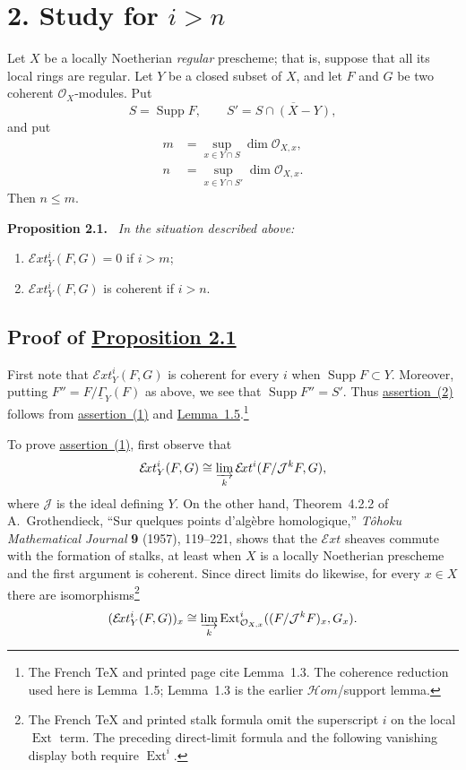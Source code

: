 \documentclass[11pt,a4paper,oneside]{book}
\providecommand{\sisi}[2]{#2}
\providecommand{\Jj}{\mathcal J}
\providecommand{\Oo}{\mathcal O}
\providecommand{\SheafGamma}{\underline{\Gamma}}
\providecommand{\SheafExt}{\mathcal E\!xt}
\providecommand{\OX}{\mathcal O_X}
\providecommand{\Supp}{\operatorname{Supp}}
\providecommand{\Extop}{\operatorname{Ext}}
\newenvironment{sgastatement}[1]
  {\par\addvspace{0.8\baselineskip}\noindent\textbf{#1.}\ \itshape}
  {\par\addvspace{0.35\baselineskip}}
\theoremstyle{plain}
\theoremstyle{definition}
\theoremstyle{remark}
\begin{document}
\section*{2. Study for $i>n$}

Let $X$ be a locally Noetherian \emph{regular} prescheme; that is, suppose that
all its local rings are regular. Let $Y$ be a closed subset of $X$, and let
$F$ and $G$ be two coherent $\OX$-modules. Put
\[
  S=\Supp F,\qquad S'=\overline{S\cap(X-Y)},
\]
and put
\begin{align*}
  m&=\sup_{x\in Y\cap S}\dim\Oo_{X,x},\\
  n&=\sup_{x\in Y\cap S'}\dim\Oo_{X,x}.
\end{align*}
Then $n\leq m$.

\begin{sgastatement}{Proposition 2.1}
In the situation described above:
\begin{enumerate}
\item $\SheafExt_Y^i(F,G)=0$ if $i>m$;
\item $\SheafExt_Y^i(F,G)$ is coherent if $i>n$.
\end{enumerate}
\end{sgastatement}

\subsection*{Proof of \hyperref[VII.2.1]{Proposition 2.1}}

First note that $\SheafExt_Y^i(F,G)$ is coherent for every $i$ when
$\Supp F\subset Y$. Moreover, putting $F''=F/\sisi{\Gamma}{\SheafGamma}_Y(F)$ as above, we see
that $\Supp F''=S'$. Thus \hyperref[VII.2.1]{assertion~(2)} follows from \hyperref[VII.2.1]{assertion~(1)} and
\hyperref[VII.1.5]{Lemma~1.5}.\footnote{The French TeX and printed page cite Lemma~1.3. The
coherence reduction used here is Lemma~1.5; Lemma~1.3 is the earlier
$\mathcal Hom$/support lemma.}

To prove \hyperref[VII.2.1]{assertion~(1)}, first observe that
\[
  \SheafExt_Y^i(F,G)\cong
  \varinjlim_k \SheafExt^i(F/\Jj^kF,G),
\]
where $\Jj$ is the ideal defining $Y$. On the other hand, Theorem~4.2.2 of
A.~Grothendieck, ``Sur quelques points d'alg\`ebre homologique,''
\emph{T\^ohoku Mathematical Journal} \textbf{9} (1957), 119--221, shows that
the $\SheafExt$ sheaves commute with the formation of stalks, at least when
$X$ is a locally Noetherian prescheme and the first argument is coherent.
Since direct limits do likewise, for every $x\in X$ there are
isomorphisms\footnote{The French TeX and printed stalk formula omit the
superscript $i$ on the local $\Extop$ term. The preceding direct-limit formula
and the following vanishing display both require $\Extop^i$.}
\[
  (\SheafExt_Y^i(F,G))_x\cong
  \varinjlim_k
  \Extop^i_{\Oo_{X,x}}((F/\Jj^kF)_x,G_x).
\]
\end{document}
